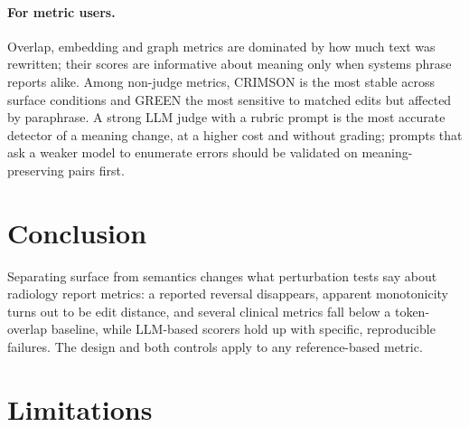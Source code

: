 \documentclass[11pt]{article}
\begin{document}
\paragraph{For metric users.}
Overlap, embedding and graph metrics are dominated by how much text was rewritten; their scores are informative about meaning only when systems phrase reports alike. Among non-judge metrics, CRIMSON is the most stable across surface conditions and GREEN the most sensitive to matched edits but affected by paraphrase. A strong LLM judge with a rubric prompt is the most accurate detector of a meaning change, at a higher cost and without grading; prompts that ask a weaker model to enumerate errors should be validated on meaning-preserving pairs first.

\section{Conclusion}

Separating surface from semantics changes what perturbation tests say about radiology report metrics: a reported reversal disappears, apparent monotonicity turns out to be edit distance, and several clinical metrics fall below a token-overlap baseline, while LLM-based scorers hold up with specific, reproducible failures. The design and both controls apply to any reference-based metric.

\section*{Limitations}
\end{document}
